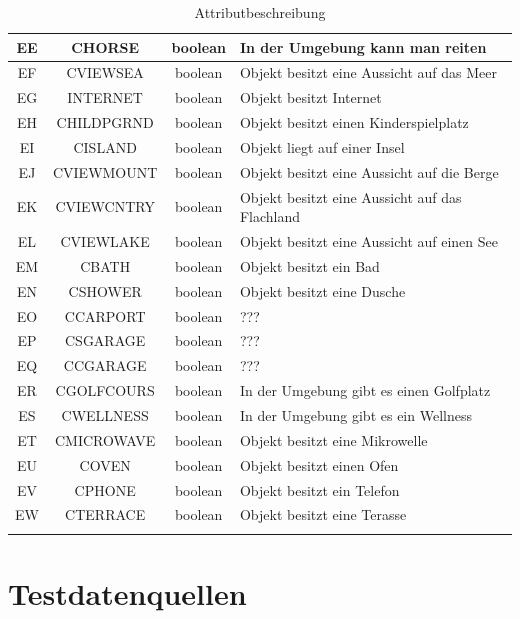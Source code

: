 \begin{longtable}{ | c | c | c | L{7.5cm} | }
	EE & CHORSE & boolean & In der Umgebung kann man reiten \\ \hline 
	EF & CVIEWSEA & boolean & Objekt besitzt eine Aussicht auf das Meer \\ \hline 
	EG & INTERNET & boolean & Objekt besitzt Internet \\ \hline 
	EH & CHILDPGRND & boolean & Objekt besitzt einen Kinderspielplatz \\ \hline 
	EI & CISLAND & boolean & Objekt liegt auf einer Insel \\ \hline 
	EJ & CVIEWMOUNT & boolean & Objekt besitzt eine Aussicht auf die Berge \\ \hline 
	EK & CVIEWCNTRY & boolean & Objekt besitzt eine Aussicht auf das Flachland \\ \hline 
	EL & CVIEWLAKE & boolean & Objekt besitzt eine Aussicht auf einen See \\ \hline 
	EM & CBATH & boolean & Objekt besitzt ein Bad \\ \hline 
	EN & CSHOWER & boolean & Objekt besitzt eine Dusche \\ \hline 
	EO & CCARPORT & boolean & ??? \\ \hline 
	EP & CSGARAGE & boolean & ??? \\ \hline 
	EQ & CCGARAGE & boolean & ??? \\ \hline 
	ER & CGOLFCOURS & boolean & In der Umgebung gibt es einen Golfplatz \\ \hline 
	ES & CWELLNESS & boolean & In der Umgebung gibt es ein Wellness \\ \hline 
	ET & CMICROWAVE & boolean & Objekt besitzt eine Mikrowelle \\ \hline 
	EU & COVEN & boolean & Objekt besitzt einen Ofen \\ \hline 
	EV & CPHONE & boolean & Objekt besitzt ein Telefon \\ \hline 
	EW & CTERRACE & boolean & Objekt besitzt eine Terasse \\ \hline 
	\caption{Attributbeschreibung}
\end{longtable} 

\chapter{Testdatenquellen}
\label{app:testdatenquellen}



